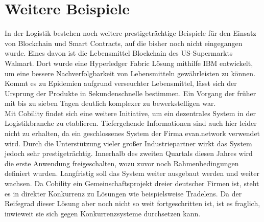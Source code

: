 \section{Weitere Beispiele}
In der Logistik bestehen noch weitere prestigeträchtige Beispiele für den Einsatz von Blockchain und Smart Contracts, auf die bisher noch nicht eingegangen wurde. Eines davon ist die Lebensmittel Blockchain des US-Supermarkts Walmart. Dort wurde eine Hyperledger Fabric Lösung mithilfe IBM entwickelt, um eine bessere Nachverfolgbarkeit von Lebensmitteln gewährleisten zu können. Kommt es zu Epidemien aufgrund verseuchter Lebensmittel, lässt sich der Ursprung der Produkte in Sekundenschnelle bestimmen. Ein Vorgang der früher mit bis zu sieben Tagen deutlich komplexer zu bewerkstelligen war. \cite[vgl.][]{Hyperledger2019}\\
Mit Cobility findet sich eine weitere Initiative, um ein dezentrales System in der Logistikbranche zu etablieren. Tiefergehende Informationen sind auch hier leider nicht zu erhalten, da ein geschlossenes System der Firma evan.network verwendet wird. Durch die Unterstützung vieler großer Industriepartner wirkt das System jedoch sehr prestigeträchtig. Innerhalb des zweiten Quartals diesen Jahres wird die erste Anwendung freigeschalten, wozu zuvor noch Rahmenbedingungen definiert wurden. Langfristig soll das System weiter ausgebaut werden und weiter wachsen. Da Cobility ein Gemeinschaftsprojekt dreier deutscher Firmen ist, steht es in direkter Konkurrenz zu Lösungen wie beispielsweise Tradelens. Da der Reifegrad dieser Lösung aber noch nicht so weit fortgeschritten ist, ist es fraglich, inwieweit sie sich gegen Konkurrenzsysteme durchsetzen kann. \cite[vgl.][]{Cobility2019}